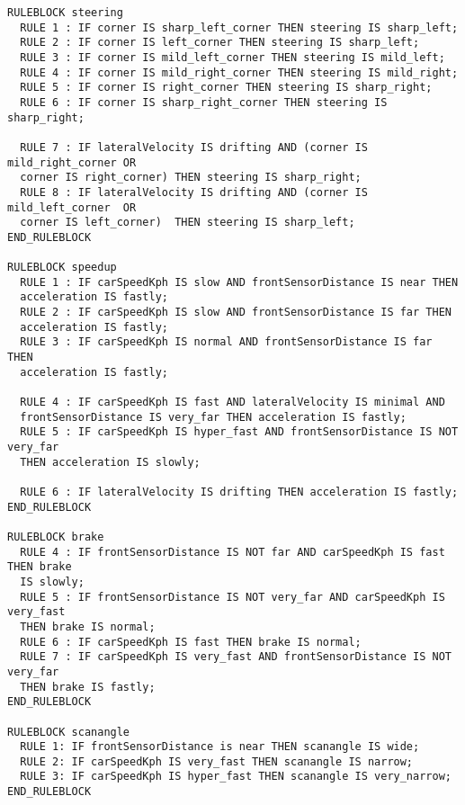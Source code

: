\begin{lstlisting}
RULEBLOCK steering
  RULE 1 : IF corner IS sharp_left_corner THEN steering IS sharp_left;
  RULE 2 : IF corner IS left_corner THEN steering IS sharp_left;
  RULE 3 : IF corner IS mild_left_corner THEN steering IS mild_left;
  RULE 4 : IF corner IS mild_right_corner THEN steering IS mild_right;
  RULE 5 : IF corner IS right_corner THEN steering IS sharp_right;
  RULE 6 : IF corner IS sharp_right_corner THEN steering IS sharp_right;

  RULE 7 : IF lateralVelocity IS drifting AND (corner IS mild_right_corner OR 
  corner IS right_corner) THEN steering IS sharp_right;
  RULE 8 : IF lateralVelocity IS drifting AND (corner IS mild_left_corner  OR 
  corner IS left_corner)  THEN steering IS sharp_left;
END_RULEBLOCK

RULEBLOCK speedup
  RULE 1 : IF carSpeedKph IS slow AND frontSensorDistance IS near THEN 
  acceleration IS fastly;
  RULE 2 : IF carSpeedKph IS slow AND frontSensorDistance IS far THEN 
  acceleration IS fastly;
  RULE 3 : IF carSpeedKph IS normal AND frontSensorDistance IS far THEN 
  acceleration IS fastly;

  RULE 4 : IF carSpeedKph IS fast AND lateralVelocity IS minimal AND 
  frontSensorDistance IS very_far THEN acceleration IS fastly;
  RULE 5 : IF carSpeedKph IS hyper_fast AND frontSensorDistance IS NOT very_far 
  THEN acceleration IS slowly;

  RULE 6 : IF lateralVelocity IS drifting THEN acceleration IS fastly;
END_RULEBLOCK

RULEBLOCK brake
  RULE 4 : IF frontSensorDistance IS NOT far AND carSpeedKph IS fast THEN brake 
  IS slowly;
  RULE 5 : IF frontSensorDistance IS NOT very_far AND carSpeedKph IS very_fast 
  THEN brake IS normal;
  RULE 6 : IF carSpeedKph IS fast THEN brake IS normal;
  RULE 7 : IF carSpeedKph IS very_fast AND frontSensorDistance IS NOT very_far 
  THEN brake IS fastly;
END_RULEBLOCK

RULEBLOCK scanangle
  RULE 1: IF frontSensorDistance is near THEN scanangle IS wide;
  RULE 2: IF carSpeedKph IS very_fast THEN scanangle IS narrow;
  RULE 3: IF carSpeedKph IS hyper_fast THEN scanangle IS very_narrow;
END_RULEBLOCK
\end{lstlisting}